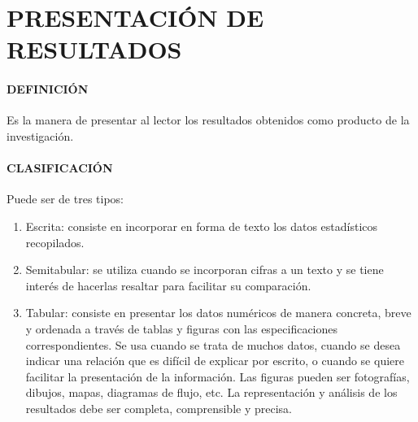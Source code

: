 \section{PRESENTACIÓN DE RESULTADOS}

\paragraph{DEFINICIÓN}
Es la manera de presentar al lector los resultados obtenidos como producto de la investigación.

\paragraph{CLASIFICACIÓN}
Puede ser de tres tipos:

\begin{enumerate}
 \item Escrita: consiste en incorporar en forma de texto los datos estadísticos recopilados.
 \item Semitabular: se utiliza cuando se incorporan cifras a un texto y se tiene interés de hacerlas resaltar para facilitar su comparación.
 \item Tabular: consiste en presentar los datos numéricos de manera concreta, breve y ordenada a través de tablas y figuras con las especificaciones correspondientes. Se usa cuando se trata de muchos datos, cuando se desea indicar una relación que es difícil de explicar por escrito, o cuando se quiere facilitar la presentación de la información. Las figuras pueden ser fotografías, dibujos, mapas, diagramas de flujo, etc. La representación y análisis de los resultados debe ser completa, comprensible y precisa.
\end{enumerate}